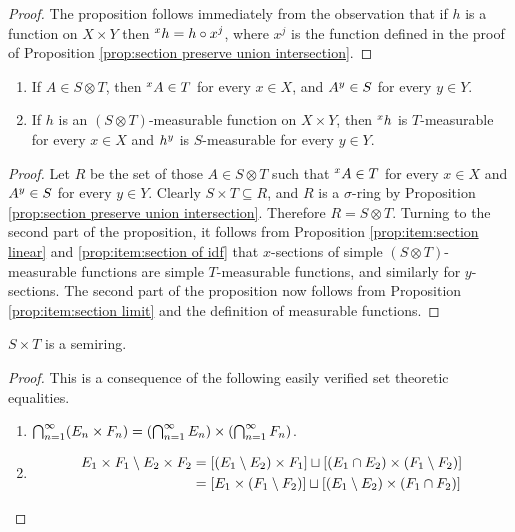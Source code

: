 \begin{proof}
The proposition follows immediately from the observation that if $h$ is a function on $X\times Y$ then $\xsec{h}{x}=h\circ x^j$, where $x^j$ is the function defined in the proof of Proposition \ref{prop:section preserve union intersection}.
\end{proof}

\begin{proposition}
\begin{enumerate}
    \item\label{prop:item:sections of sets meas}
    If $A\in S\otimes T$, then $\xsec{A}{x}\in T$ for every $x\in X$, and $\ysec{A}{y}\in S$ for every $y\in Y$.
    
    \item If $h$ is an $(S\otimes T)$-measurable function on $X\times Y$, then $\xsec{h}{x}$ is $T$-measurable for every $x\in X$ and $\ysec{h}{y}$ is $S$-measurable for every $y\in Y$.
\end{enumerate}
\end{proposition}

\begin{proof}
Let $R$ be the set of those $A\in S\otimes T$ such that $\xsec{A}{x}\in T$ for every $x\in X$ and $\ysec{A}{y}\in S$ for every $y\in Y$. Clearly $S\times T\subseteq R$, and $R$ is a $\sigma$-ring by Proposition \ref{prop:section preserve union intersection}. Therefore $R=S\otimes T$. Turning to the second part of the proposition, it follows from Proposition \ref{prop:item:section linear} and \ref{prop:item:section of idf} that $x$-sections of simple $(S\otimes T)$-measurable functions are simple $T$-measurable functions, and similarly for $y$-sections. The second part of the proposition now follows from Proposition \ref{prop:item:section limit} and the definition of measurable functions.
\end{proof}

\begin{lemma}
$S\times T$ is a semiring.
\end{lemma}

\begin{proof}
This is a consequence of the following easily verified set theoretic equalities.
\begin{enumerate}
    \item $\bigcap_{n=1}^\infty(E_n\times F_n)=\br{\bigcap_{n=1}^\infty E_n}\times\br{\bigcap_{n=1}^\infty F_n}$.
    
    \item
    \begin{align*}
        E_1\times F_1\sd E_2\times F_2&=\sbr{(E_1\sd E_2)\times F_1}\du[(E_1\cap E_2)\times(F_1\sd F_2)]\\
        &=[E_1\times(F_1\sd F_2)]\du[(E_1\sd E_2)\times(F_1\cap F_2)]
    \end{align*}
\end{enumerate}
\end{proof}

